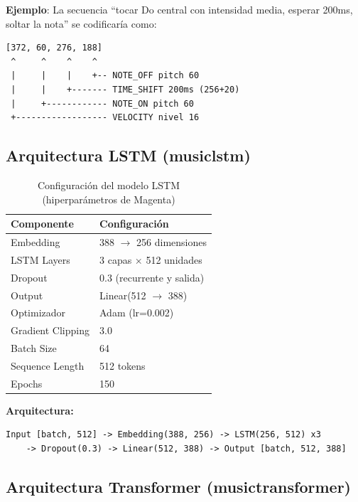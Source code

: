 \documentclass[12pt,a4paper]{article}
\begin{document}
\textbf{Ejemplo}: La secuencia ``tocar Do central con intensidad media, esperar 200ms, soltar la nota'' se codificaría como:
\begin{verbatim}
[372, 60, 276, 188]
 ^     ^    ^    ^
 |     |    |    +-- NOTE_OFF pitch 60
 |     |    +------- TIME_SHIFT 200ms (256+20)
 |     +------------ NOTE_ON pitch 60
 +------------------ VELOCITY nivel 16
\end{verbatim}

\subsection{Arquitectura LSTM (musiclstm)}

\begin{table}[H]
\centering
\begin{tabular}{ll}
\toprule
\textbf{Componente} & \textbf{Configuración} \\
\midrule
Embedding & 388 $\rightarrow$ 256 dimensiones \\
LSTM Layers & 3 capas $\times$ 512 unidades \\
Dropout & 0.3 (recurrente y salida) \\
Output & Linear(512 $\rightarrow$ 388) \\
\midrule
Optimizador & Adam (lr=0.002) \\
Gradient Clipping & 3.0 \\
Batch Size & 64 \\
Sequence Length & 512 tokens \\
Epochs & 150 \\
\bottomrule
\end{tabular}
\caption{Configuración del modelo LSTM (hiperparámetros de Magenta)}
\end{table}

\textbf{Arquitectura:}
\begin{lstlisting}
Input [batch, 512] -> Embedding(388, 256) -> LSTM(256, 512) x3
    -> Dropout(0.3) -> Linear(512, 388) -> Output [batch, 512, 388]
\end{lstlisting}

\subsection{Arquitectura Transformer (musictransformer)}
\end{document}
